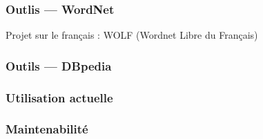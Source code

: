 \begin{frame}
  \frametitle{Outlis --- WordNet}
  Projet sur le français : WOLF (Wordnet Libre du Français) 
\end{frame}

\begin{frame}
  \frametitle{Outils --- DBpedia}
\end{frame}

\begin{frame}
  \frametitle{Utilisation actuelle}
\end{frame}

\begin{frame}
  \frametitle{Maintenabilité}
\end{frame}

